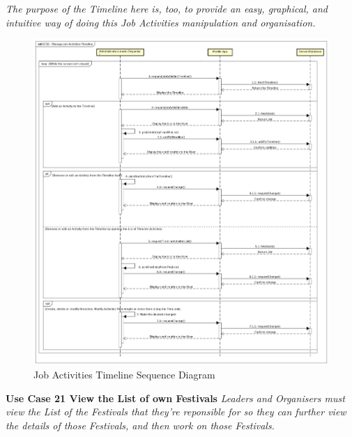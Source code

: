 				\textit{The purpose of the Timeline here is, too, to provide an easy, graphical, and intuitive way of doing this Job Activities manipulation and organisation.}
				
				\begin{figure}[H]
					\includegraphics[width=\linewidth]{diagrams/sd-diag2-jat.png}
					\caption{Job Activities Timeline Sequence Diagram}
					\label{fig:sd2_job_activities_timeline}
				\end{figure}
				
				\textbf{Use Case 21 View the List of own Festivals}
				\textit{Leaders and Organisers must view the List of the Festivals that they're reponsible for so they can further view the details of those Festivals, and then work on those Festivals.}
				
